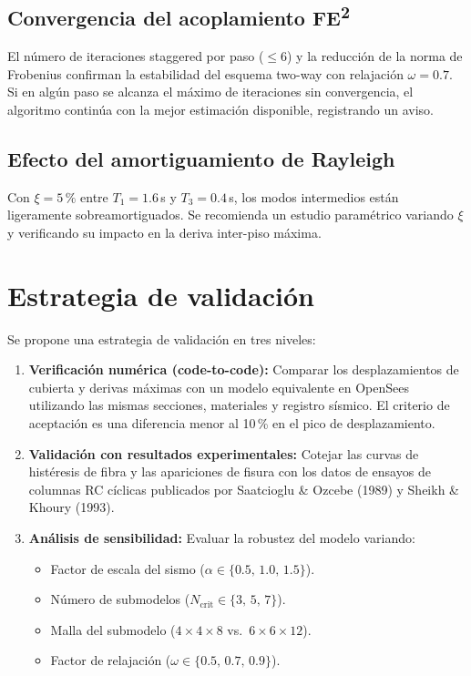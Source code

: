 \subsection{Convergencia del acoplamiento FE\textsuperscript{2}}

El número de iteraciones staggered por paso ($\leq 6$) y la reducción
de la norma de Frobenius confirman la estabilidad del esquema
two-way con relajación $\omega = 0{.}7$.  Si en algún paso se alcanza
el máximo de iteraciones sin convergencia, el algoritmo continúa con
la mejor estimación disponible, registrando un aviso.

\subsection{Efecto del amortiguamiento de Rayleigh}

Con $\xi = 5\,\%$ entre $T_1 = 1{.}6$\,s y $T_3 = 0{.}4$\,s, los
modos intermedios están ligeramente sobreamortiguados.  Se recomienda
un estudio paramétrico variando $\xi$ y verificando su impacto en la
deriva inter-piso máxima.


\section{Estrategia de validación}
\label{sec:ms16-validation}

Se propone una estrategia de validación en tres niveles:

\begin{enumerate}
  \item \textbf{Verificación numérica (code-to-code):}
    Comparar los desplazamientos de cubierta y derivas máximas con un
    modelo equivalente en OpenSees utilizando las mismas secciones,
    materiales y registro sísmico.  El criterio de aceptación es una
    diferencia menor al 10\,\% en el pico de desplazamiento.

  \item \textbf{Validación con resultados experimentales:}
    Cotejar las curvas de histéresis de fibra y las apariciones de
    fisura con los datos de ensayos de columnas RC cíclicas publicados
    por Saatcioglu \& Ozcebe (1989) y Sheikh \& Khoury (1993).

  \item \textbf{Análisis de sensibilidad:}
    Evaluar la robustez del modelo variando:
    \begin{itemize}
      \item Factor de escala del sismo ($\alpha \in \{0.5,\, 1.0,\, 1.5\}$).
      \item Número de submodelos ($N_{\text{crit}} \in \{3,\, 5,\, 7\}$).
      \item Malla del submodelo ($4\times 4\times 8$ vs.\
            $6\times 6\times 12$).
      \item Factor de relajación ($\omega \in \{0.5,\, 0.7,\, 0.9\}$).
    \end{itemize}
\end{enumerate}

